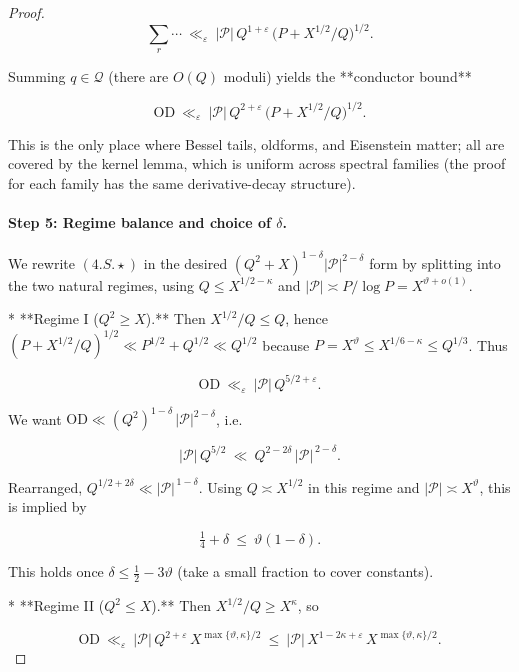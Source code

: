 \documentclass[11pt]{article}
\theoremstyle{definition}
\theoremstyle{remark}
\begin{document}
\begin{proof}
$$
\sum_{r}\cdots\ \ll_\varepsilon\ |\mathcal P|\,Q^{1+\varepsilon}\,\big(P+X^{1/2}/Q\big)^{1/2}.
$$

Summing $q\in\mathcal Q$ (there are $O(Q)$ moduli) yields the **conductor bound**

\begin{equation}
\boxed{\ \ \mathrm{OD}\ \ll_\varepsilon\ |\mathcal P|\,Q^{2+\varepsilon}\,\big(P+X^{1/2}/Q\big)^{1/2}.\ \ }
\tag{4.S.X}
\end{equation}

This is the only place where Bessel tails, oldforms, and Eisenstein matter; all are covered by the kernel lemma, which is uniform across spectral families (the proof for each family has the same derivative-decay structure).

\paragraph{Step 5: Regime balance and choice of $\delta$.}

We rewrite $(4.S.\!\star)$ in the desired $(Q^2+X)^{1-\delta}|\mathcal P|^{2-\delta}$ form by splitting into the two natural regimes, using $Q\le X^{1/2-\kappa}$ and $|\mathcal P|\asymp P/\log P=X^{\vartheta+o(1)}$.

* **Regime I ($Q^2\ge X$).** Then $X^{1/2}/Q\le Q$, hence $(P+X^{1/2}/Q)^{1/2}\ll P^{1/2}+Q^{1/2}\ll Q^{1/2}$ because $P=X^\vartheta\le X^{1/6-\kappa}\le Q^{1/3}$. Thus

  $$
  \mathrm{OD}\ \ll_\varepsilon\ |\mathcal P|\,Q^{5/2+\varepsilon}.
  $$

  We want $\mathrm{OD}\ll (Q^2)^{1-\delta}\,|\mathcal P|^{2-\delta}$, i.e.

  $$
  |\mathcal P|\,Q^{5/2}\ \ll\ Q^{2-2\delta}\,|\mathcal P|^{\,2-\delta}.
  $$

  Rearranged, $Q^{1/2+2\delta}\ll |\mathcal P|^{\,1-\delta}$. Using $Q\asymp X^{1/2}$ in this regime and $|\mathcal P|\asymp X^\vartheta$, this is implied by

  $$
  \tfrac14+\delta\ \le\ \vartheta(1-\delta).
  $$

  This holds once $\delta\le \tfrac12-3\vartheta$ (take a small fraction to cover constants).

* **Regime II ($Q^2\le X$).** Then $X^{1/2}/Q\ge X^\kappa$, so

  $$
  \mathrm{OD}\ \ll_\varepsilon\ |\mathcal P|\,Q^{2+\varepsilon}\,X^{\max\{\vartheta,\kappa\}/2}
  \ \le\ |\mathcal P|\,X^{1-2\kappa+\varepsilon}\,X^{\max\{\vartheta,\kappa\}/2}.
  $$


\end{proof}
\end{document}
